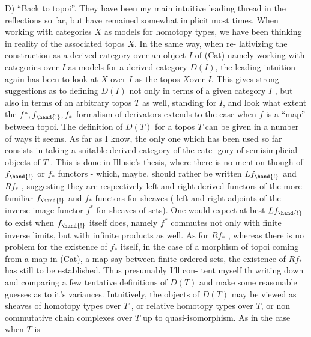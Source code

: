 D) ``Back to topoi''.  They have been my main intuitive leading thread in
the reflections so far,  but have remained somewhat implicit most times.
When working with categories  $X$ as models for homotopy types,  we have been
thinking in reality of the associated topos $X\hat{}$.  In the same way,  when re-%
lativizing the  construction  as a derived category over an object $I$
of (Cat)\hand{,} \hand{$\swarrow$}%
 namely working with categories over $I$ as models for a derived
category $D(I)$,  the leading intuition again has been to look at $X$ over $I$
as the topos $X\hat{}$\hand{/}over $I\hat{}$.  This gives strong suggestions as to defining
$D(I)$ not only in terms of a given category $I$ ,  but also in terms of an
arbitrary topos $T$  as well,  standing for $I\hat{}$,  and look  what extent the
$f^{*},f_{\hand{!}},f_{*}$  formalism of derivators extends to the case when $f$ is a ``map''
between topoi.  The definition of  $D(T)$ for a topos $T$ can be given in a
number of ways it seems.  As far as I know,  the only one which has been
 used so far consists in taking  a suitable derived category of the cate-%
gory of semisimplicial objects of $T$ .  This is done in Illusie's thesis,
where there is no mention though of $f_{\hand{!}}$ or $f_{*}$ functors  -  which,  maybe,
should rather be written $Lf_{\hand{!}}$  and $Rf_{*}$ ,  suggesting they are respectively
left and right derived functors of the more familiar $f_{\hand{!}}$ and $f_{*}$  functors
for sheaves ( left and right adjoints of the inverse image functor $f^{*}$  for
sheaves of sets).  One would expect\hand{,} at  best\hand{,} $Lf_{\hand{!}}$  to exist when $f_{\hand{!}}$ itself
does,  namely  $f^{*}$  commutes not only with finite inverse limits,  but with
infinite products as well.  As for $Rf_{*}$ ,  whereas there is no problem for
the existence of $f_{*}$ itself,    in the case of a morphism of topoi
coming from a map in (Cat),  a map say between finite ordered sets,  the
existence of $Rf_{*}$  has still to be established.  Thus presumably I'll con-%
tent myself th writing down and comparing a few tentative definitions of
$D(T)$ and make some reasonable guesses as to it's  variances.
Intuitively,  the objects of $D(T)$  may be viewed as sheaves of homotopy
types over $T$ , or relative homotopy types over $T$,  or non commutative
chain complexes over $T$ up to quasi-isomorphism.  As in the case when $T$ is

